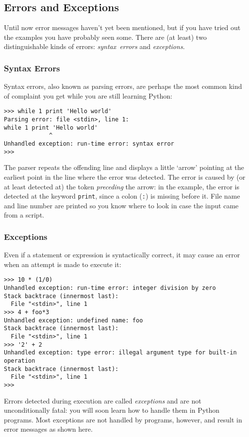 \subsection{Errors and Exceptions}

Until now error messages haven't yet been mentioned, but if you have
tried out the examples you have probably seen some.
There are (at least) two distinguishable kinds of errors:
{\em syntax\ errors}
and
{\em exceptions}.

\subsubsection{Syntax Errors}

Syntax errors, also known as parsing errors, are perhaps the most common
kind of complaint you get while you are still learning Python:
\bcode\begin{verbatim}
>>> while 1 print 'Hello world'
Parsing error: file <stdin>, line 1:
while 1 print 'Hello world'
             ^
Unhandled exception: run-time error: syntax error
>>> 
\end{verbatim}\ecode
The parser repeats the offending line and displays a little `arrow'
pointing at the earliest point in the line where the error was detected.
The error is caused by (or at least detected at) the token
{\em preceding}
the arrow: in the example, the error is detected at the keyword
{\tt print}, since a colon ({\tt :}) is missing before it.
File name and line number are printed so you know where to look in case
the input came from a script.

\subsubsection{Exceptions}

Even if a statement or expression is syntactically correct, it may cause
an error when an attempt is made to execute it:
\bcode\small\begin{verbatim}
>>> 10 * (1/0)
Unhandled exception: run-time error: integer division by zero
Stack backtrace (innermost last):
  File "<stdin>", line 1
>>> 4 + foo*3
Unhandled exception: undefined name: foo
Stack backtrace (innermost last):
  File "<stdin>", line 1
>>> '2' + 2
Unhandled exception: type error: illegal argument type for built-in operation
Stack backtrace (innermost last):
  File "<stdin>", line 1
>>> 
\end{verbatim}\ecode
Errors detected during execution are called
{\em exceptions}
and are not unconditionally fatal: you will soon learn how to handle
them in Python programs.
Most exceptions are not handled by programs, however, and result
in error messages as shown here.

